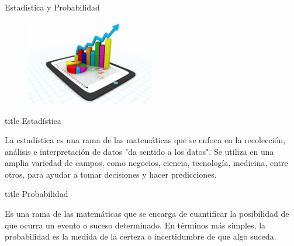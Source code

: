 \documentclass{beamer}
\date{}
\begin{document}
\title[U CENTRAL]{} 
\author{JOSE A CARRILLO M } 


\begin{frame}
  \vspace{1cm}
  \centering
  {\Huge Estadística y Probabilidad }
  \vfill
  \begin{figure}[ht]
    \centering
    \includegraphics[width=0.5\textwidth]{imagen.png}
  \end{figure}
\end{frame}


\begin{frame}
\centering
\begin{beamercolorbox}[sep=8pt,center]{title}
{\Huge Estadística}
\inserttitle\par%
\end{beamercolorbox}

\justify
\vspace{0.5cm}
La estadística es una rama de las matemáticas que se enfoca en la recolección, análisis e interpretación de datos "da sentido a los datos". 
\vspace{0.5cm}
Se utiliza en una amplia variedad de campos, como negocios, ciencia, tecnología, medicina, entre otros, para ayudar a tomar decisiones y hacer predicciones.
\end{frame}

\begin{frame}
\centering
\begin{beamercolorbox}[sep=8pt,center]{title}
{\Huge Probabilidad}
\inserttitle\par%
\end{beamercolorbox}

\justify
\vspace{0.5cm}
Es una rama de las matemáticas que se encarga de cuantificar la posibilidad de que ocurra un evento o suceso determinado. En términos más simples, la probabilidad es la medida de la certeza o incertidumbre de que algo suceda.
\end{frame}
\end{document}
